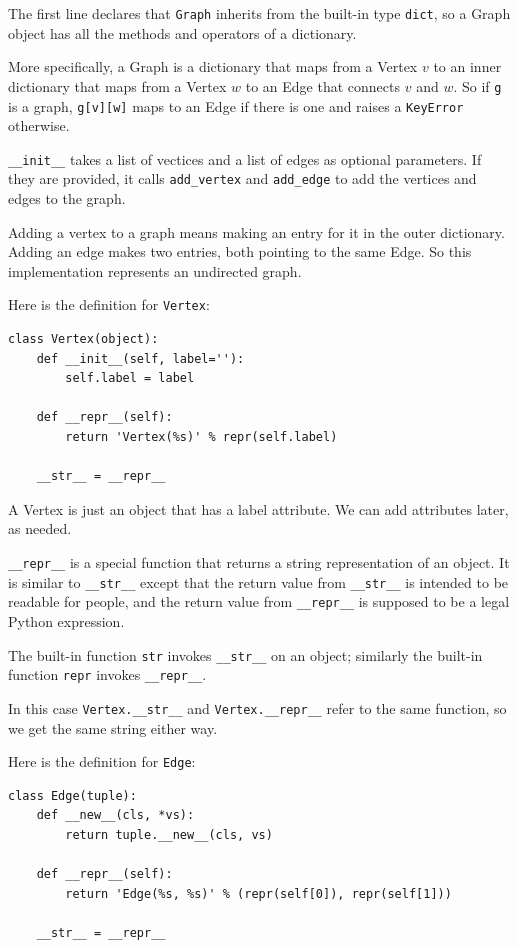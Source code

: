 \documentclass[10pt]{book}
\begin{document}
The first line declares that {\tt Graph} inherits from the built-in
type {\tt dict}, so a Graph object has all the methods and operators
of a dictionary.

More specifically, a Graph is a dictionary that maps from
a Vertex $v$ to an inner dictionary that maps from a Vertex $w$
to an Edge that connects $v$ and $w$.  So if {\tt g} is a graph,
{\tt g[v][w]} maps to an Edge if there is one and raises
a {\tt KeyError} otherwise.

\verb"__init__" takes a list of vectices and a list of
edges as optional parameters.  If they are provided, it calls
\verb"add_vertex" and \verb"add_edge" to add the vertices and edges to
the graph.

Adding a vertex to a graph means making an entry for it in the
outer dictionary.  Adding an edge makes two entries, both pointing
to the same Edge.  So this implementation represents an undirected
graph.

Here is the definition for {\tt Vertex}:

\begin{verbatim}
class Vertex(object):
    def __init__(self, label=''):
        self.label = label

    def __repr__(self):
        return 'Vertex(%s)' % repr(self.label)

    __str__ = __repr__
\end{verbatim}

A Vertex is just an object that has a label attribute.  We can
add attributes later, as needed.

\verb"__repr__" is a special function that returns a string
representation of an object.  It is similar to \verb"__str__" except
that the return value from \verb"__str__" is intended to be readable
for people, and the return value from \verb"__repr__" is supposed to
be a legal Python expression.

The built-in function {\tt str} invokes \verb"__str__" on
an object; similarly the built-in function {\tt repr} invokes
\verb"__repr__".

In this case \verb"Vertex.__str__" and \verb"Vertex.__repr__" refer to
the same function, so we get the same string either way.

Here is the definition for {\tt Edge}:

\begin{verbatim}
class Edge(tuple):
    def __new__(cls, *vs):
        return tuple.__new__(cls, vs)

    def __repr__(self):
        return 'Edge(%s, %s)' % (repr(self[0]), repr(self[1]))

    __str__ = __repr__
\end{verbatim}
\end{document}
